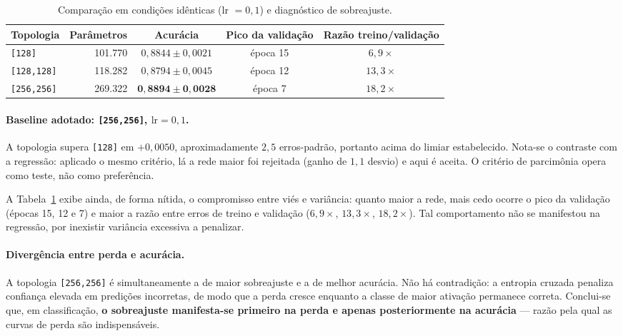 \documentclass[11pt,a4paper]{article}
\begin{document}
\begin{table}[htbp]
\centering
\caption{Comparação em condições idênticas (lr $=0{,}1$) e diagnóstico de sobreajuste.}
\label{tab:clf-verif}
\begin{tabular}{lrccc}
\toprule
Topologia & Parâmetros & Acurácia & Pico da validação & Razão treino/validação \\
\midrule
\texttt{[128]}     & 101.770 & $0{,}8844 \pm 0{,}0021$ & época 15 & $6{,}9\times$ \\
\texttt{[128,128]} & 118.282 & $0{,}8794 \pm 0{,}0045$ & época 12 & $13{,}3\times$ \\
\texttt{[256,256]} & 269.322 & $\mathbf{0{,}8894 \pm 0{,}0028}$ & época 7 & $18{,}2\times$ \\
\bottomrule
\end{tabular}
\end{table}

\paragraph{Baseline adotado: \texttt{[256,256]}, $\text{lr}=0{,}1$.} A topologia supera
\texttt{[128]} em $+0{,}0050$, aproximadamente $2{,}5$ erros-padrão, portanto acima do
limiar estabelecido. Nota-se o contraste com a regressão: aplicado o mesmo critério, lá
a rede maior foi rejeitada (ganho de $1{,}1$ desvio) e aqui é aceita. O critério de
parcimônia opera como teste, não como preferência.

A Tabela~\ref{tab:clf-verif} exibe ainda, de forma nítida, o compromisso entre viés e
variância: quanto maior a rede, mais cedo ocorre o pico da validação (épocas 15, 12 e 7)
e maior a razão entre erros de treino e validação ($6{,}9\times$, $13{,}3\times$,
$18{,}2\times$). Tal comportamento não se manifestou na regressão, por inexistir
variância excessiva a penalizar.

\paragraph{Divergência entre perda e acurácia.} A topologia \texttt{[256,256]} é
simultaneamente a de maior sobreajuste e a de melhor acurácia. Não há contradição: a
entropia cruzada penaliza confiança elevada em predições incorretas, de modo que a perda
cresce enquanto a classe de maior ativação permanece correta. Conclui-se que, em
classificação, \textbf{o sobreajuste manifesta-se primeiro na perda e apenas
posteriormente na acurácia} --- razão pela qual as curvas de perda são indispensáveis.
\end{document}
